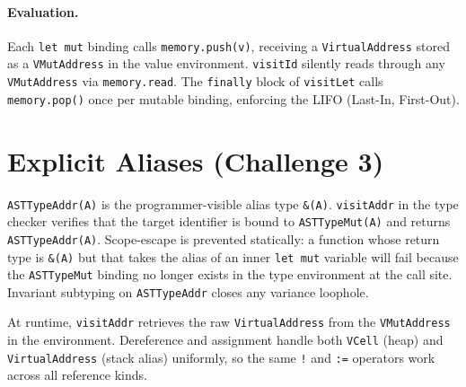 \documentclass[10pt,a4paper]{article}
\begin{document}
\paragraph{Evaluation.}
Each \texttt{let mut} binding calls \texttt{memory.push(v)}, receiving a
\texttt{VirtualAddress} stored as a \texttt{VMutAddress} in the value environment.
\texttt{visitId} silently reads through any \texttt{VMutAddress} via
\texttt{memory.read}.
The \texttt{finally} block of \texttt{visitLet} calls \texttt{memory.pop()} once
per mutable binding, enforcing the LIFO (Last-In, First-Out).

\section{Explicit Aliases (Challenge 3)}

\texttt{ASTTypeAddr(A)} is the programmer-visible alias type \texttt{\&(A)}.
\texttt{visitAddr} in the type checker verifies that the target identifier is bound
to \texttt{ASTTypeMut(A)} and returns \texttt{ASTTypeAddr(A)}.
Scope-escape is prevented statically: a function whose return type is \texttt{\&(A)}
but that takes the alias of an inner \texttt{let mut} variable will fail because
the \texttt{ASTTypeMut} binding no longer exists in the type environment at the
call site.
Invariant subtyping on \texttt{ASTTypeAddr} closes any variance loophole.

At runtime, \texttt{visitAddr} retrieves the raw \texttt{VirtualAddress} from the
\texttt{VMutAddress} in the environment.
Dereference and assignment handle both \texttt{VCell} (heap) and
\texttt{VirtualAddress} (stack alias) uniformly, so the same \texttt{!} and
\texttt{:=} operators work across all reference kinds.
\end{document}

